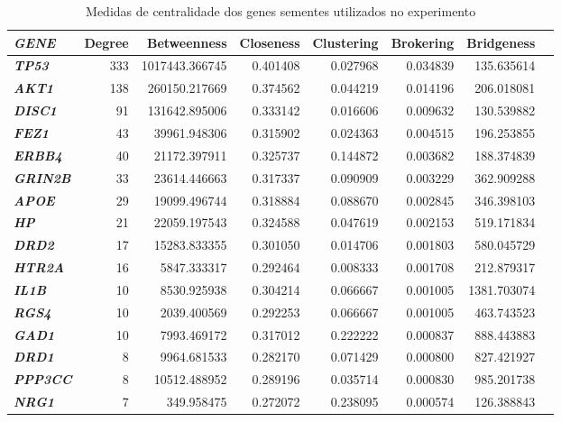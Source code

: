 \begin{table}[]
\centering
\caption{Medidas de centralidade dos genes sementes utilizados no experimento}
\label{centrality_measures}
\footnotesize
\begin{tabular}{@{}lrrrrrrr@{}}
\toprule
\textbf{\textsl{GENE}} & \textbf{Degree} &   \textbf{Betweenness} & \textbf{Closeness} & \textbf{Clustering} & \textbf{Brokering}  & \textbf{Bridgeness} \\ \midrule
\textbf{\textsl{TP53}}  & 333 & 1017443.366745 & 0.401408 & 0.027968 & 0.034839 &  135.635614 \\
\textbf{\textsl{AKT1}}  & 138 &  260150.217669 & 0.374562 & 0.044219 & 0.014196 &  206.018081 \\
\textbf{\textsl{DISC1}}  &  91 &  131642.895006 & 0.333142 & 0.016606 & 0.009632 &  130.539882 \\
\textbf{\textsl{FEZ1}}  &  43 &   39961.948306 & 0.315902 & 0.024363 & 0.004515 &  196.253855 \\
\textbf{\textsl{ERBB4}}  &  40 &   21172.397911 & 0.325737 & 0.144872 & 0.003682 &  188.374839 \\
\textbf{\textsl{GRIN2B}}  &  33 &   23614.446663 & 0.317337 & 0.090909 & 0.003229 &  362.909288 \\
\textbf{\textsl{APOE}}  &  29 &   19099.496744 & 0.318884 & 0.088670 & 0.002845 &  346.398103 \\
\textbf{\textsl{HP}}  &  21 &   22059.197543 & 0.324588 & 0.047619 & 0.002153 &  519.171834 \\
\textbf{\textsl{DRD2}}  &  17 &   15283.833355 & 0.301050 & 0.014706 & 0.001803 &  580.045729 \\
\textbf{\textsl{HTR2A}}  &  16 &    5847.333317 & 0.292464 & 0.008333 & 0.001708 &  212.879317 \\
\textbf{\textsl{IL1B}}  &  10 &    8530.925938 & 0.304214 & 0.066667 & 0.001005 & 1381.703074 \\
\textbf{\textsl{RGS4}}  &  10 &    2039.400569 & 0.292253 & 0.066667 & 0.001005 &  463.743523 \\
\textbf{\textsl{GAD1}}  &  10 &    7993.469172 & 0.317012 & 0.222222 & 0.000837 &  888.443883 \\
\textbf{\textsl{DRD1}}  &   8 &    9964.681533 & 0.282170 & 0.071429 & 0.000800 &  827.421927 \\
\textbf{\textsl{PPP3CC}}  &   8 &   10512.488952 & 0.289196 & 0.035714 & 0.000830 &  985.201738 \\
\textbf{\textsl{NRG1}}  &   7 &     349.958475 & 0.272072 & 0.238095 & 0.000574 &  126.388843 \\

\end{tabular}
\end{table}
